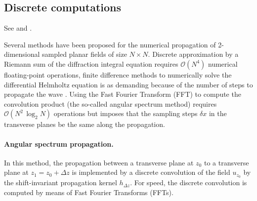 \documentclass[a4paper]{article}
\begin{document}
\subsection{Discrete computations}

See \citet{Sziklas-1974-diffraction_calculations} and \citet{Sziklas-1975-FFT_method}.

Several methods have been proposed for the numerical propagation of
2-dimensional sampled planar fields of size $N×N$. Discrete approximation by
a Riemann sum of the diffraction integral equation requires
$\mathcal{O}(N^{4})$ numerical floating-point operations, finite difference
methods to numerically solve the differential Helmholtz equation is as
demanding because of the number of steps to propagate the wave
\citep{Sziklas-1975-FFT_method}. Using the Fast Fourier Transform (FFT) to
compute the convolution product (the so-called angular spectrum method)
requires $\mathcal{O}(N^{2}\,\log_{2}N)$ operations but imposes that the
sampling steps $δx$ in the transverse planes be the same along the propagation.

\paragraph{Angular spectrum propagation.}
In this method, the propagation between a transverse plane at $z_{0}$ to a
transverse plane at $z_{1} = z_{0} + Δz$ is implemented by a discrete
convolution of the field $u_{z_{0}}$ by the shift-invariant propagation kernel
$h_{Δz}$. For speed, the discrete convolution is computed by means of Fast
Fourier Transforms (FFTs).
\end{document}
